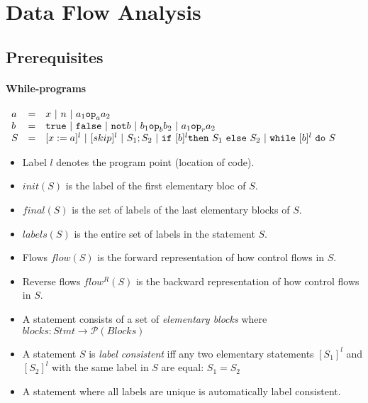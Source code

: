 
\chapter{Data Flow Analysis}
\label{chap:data-flow-analysis}

\section{Prerequisites}

\subsubsection{While-programs}

\begin{math}
  \begin{array}{lll}
    a & = & x \text{ }|\text{ } n \text{ }|\text{ } a_1 \mathtt{op}_a a_2 \\
    b & = & \mathtt{true} \text{ }|\text{ } \mathtt{false} \text{ }|\text{ } \mathtt{not} b \text{ }|\text{ } b_1 \mathtt{op}_b b_2 \text{ }|\text{ } a_1 \mathtt{op}_r a_2 \\
    S & = & [x := a]^l \text{ }|\text{ } [skip]^l \text{ }|\text{ } S_1; S_2 \text{ }|\text{ } \mathtt{if} \text{ } [b]^l \mathtt{then} \text{ } S_1 \text{ } \mathtt{else} \text{ } S_2 \text{ }|\text{ } \mathtt{while}\text{ } [b]^l \text{ } \mathtt{do} \text{ } S
  \end{array}
\end{math}


\begin{itemize}
\item Label $l$ denotes the program point (location of code).
\item $init(S)$ is the label of the first elementary bloc of $S$.
\item $final(S)$ is the set of labels of the last elementary blocks of
  $S$.
\item $labels(S)$ is the entire set of labels in the statement $S$.
\item Flows $flow(S)$ is the forward representation of how control
  flows in $S$.
\item Reverse flows $flow^R(S)$ is the backward representation of how
  control flows in $S$.
\item A statement consists of a set of \textit{elementary blocks}
  where $blocks : Stmt \to \mathcal{P}(Blocks)$
\item A statement $S$ is \textit{label consistent} iff any two
  elementary statements $[S_1]^l$ and $[S_2]^l$ with the same label in
  $S$ are equal: $S_1 = S_2$
\item A statement where all labels are unique is automatically label
  consistent.

\end{itemize}


